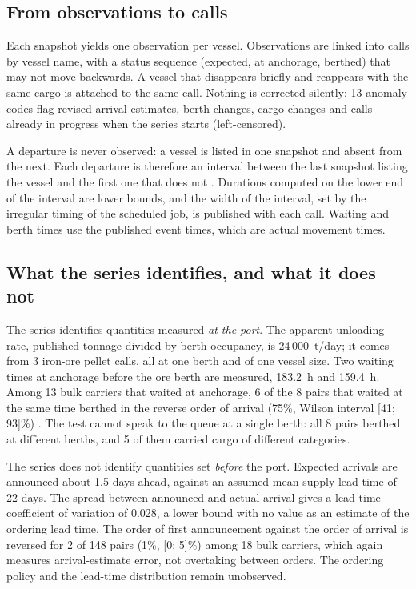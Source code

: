 \documentclass[conference]{IEEEtran}   %
\begin{document}
\subsection{From observations to calls}
Each snapshot yields one observation per vessel. Observations are linked into calls by
vessel name, with a status sequence (expected, at anchorage, berthed) that may not move
backwards. A vessel that disappears briefly and reappears with the same cargo is attached
to the same call. Nothing is corrected silently: 13 anomaly codes flag revised arrival
estimates, berth changes, cargo changes and calls already in progress when the series
starts (left-censored).

A departure is never observed: a vessel is listed in one snapshot and absent from the next.
Each departure is therefore an interval between the last snapshot listing the vessel and the
first one that does not \cite{turnbull1976}. Durations computed on the lower end
of the interval are lower
bounds, and the width of the interval, set by the irregular timing of the scheduled job, is
published with each call. Waiting and berth times use the published event times, which are
actual movement times.

\subsection{What the series identifies, and what it does not}
The series identifies quantities measured \emph{at the port}. The apparent unloading rate,
published tonnage divided by berth occupancy, is 24\,000~t/day; it comes from 3 iron-ore
pellet calls, all at one berth and of one vessel size. Two waiting times at anchorage before
the ore berth are measured, 183.2~h and 159.4~h. Among 13 bulk carriers that waited at
anchorage, 6 of the 8 pairs that waited at the same time berthed in the reverse order of
arrival (75\%, Wilson interval [41; 93]\%) \cite{wilson1927}. The test cannot speak
to the queue at a single berth: all 8 pairs berthed at different berths, and 5 of them carried
cargo of different categories.

The series does not identify quantities set \emph{before} the port. Expected arrivals are
announced about 1.5 days ahead, against an assumed mean supply lead time of 22 days. The
spread between announced and actual arrival gives a lead-time coefficient of variation of
0.028, a lower bound with no value as an estimate of the ordering lead time. The order of
first announcement against the order of arrival is reversed for 2 of 148 pairs (1\%, [0; 5]\%)
among 18 bulk carriers, which again measures arrival-estimate error, not overtaking between
orders. The ordering policy and the lead-time distribution remain unobserved.
\end{document}

